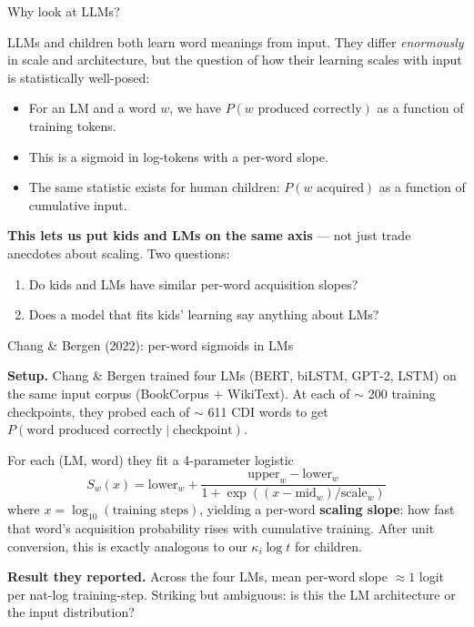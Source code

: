 \documentclass[
  ignorenonframetext,
  aspectratio=169,
  t]{beamer}
\providecommand{\tightlist}{%
  \setlength{\itemsep}{0pt}\setlength{\parskip}{0pt}}
\begin{document}
\begin{frame}{Why look at LLMs?}
\label{why-look-at-llms}
\small

LLMs and children both learn word meanings from input. They differ
\emph{enormously} in scale and architecture, but the question of how
their learning scales with input is statistically well-posed:

\vspace{0.6em}

\begin{itemize}
\tightlist
\item
  For an LM and a word \(w\), we have
  \(P(w \text{ produced correctly})\) as a function of training tokens.
\item
  This is a sigmoid in log-tokens with a per-word slope.
\item
  The same statistic exists for human children:
  \(P(w \text{ acquired})\) as a function of cumulative input.
\end{itemize}

\vspace{0.6em}

\textbf{This lets us put kids and LMs on the same axis} --- not just
trade anecdotes about scaling. Two questions:

\begin{enumerate}
\tightlist
\item
  Do kids and LMs have similar per-word acquisition slopes?
\item
  Does a model that fits kids' learning say anything about LMs?
\end{enumerate}
\end{frame}

\begin{frame}{Chang \& Bergen (2022): per-word sigmoids in LMs}
\label{chang-bergen-2022-per-word-sigmoids-in-lms}
\small

\textbf{Setup.} Chang \& Bergen trained four LMs (BERT, biLSTM, GPT-2,
LSTM) on the same input corpus (BookCorpus \(+\) WikiText). At each of
\(\sim\) 200 training checkpoints, they probed each of \(\sim\) 611 CDI
words to get
\(P(\text{word produced correctly} \mid \text{checkpoint})\).

\vspace{0.6em}

For each (LM, word) they fit a 4-parameter logistic \[
S_w(x) = \mathrm{lower}_w + \frac{\mathrm{upper}_w - \mathrm{lower}_w}
                                    {1 + \exp((x - \mathrm{mid}_w)/\mathrm{scale}_w)}
\] where \(x = \log_{10}(\text{training steps})\), yielding a per-word
\textbf{scaling slope}: how fast that word's acquisition probability
rises with cumulative training. After unit conversion, this is exactly
analogous to our \(\kappa_i \log t\) for children.

\vspace{0.6em}

\textbf{Result they reported.} Across the four LMs, mean per-word slope
\(\approx 1\) logit per nat-log training-step. Striking but ambiguous:
is this the LM architecture or the input distribution?
\end{frame}
\end{document}
